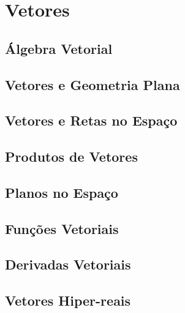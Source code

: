 \chapter{Vetores}
\label{chp:vectors}

\section{Álgebra Vetorial}
\label{sec:vectoralgebra}

\section{Vetores e Geometria Plana}
\label{sec:vectorsandplanegeometry}

\section{Vetores e Retas no Espaço}
\label{sec:vectorsinspace}

\section{Produtos de Vetores}
\label{sec:productsofvectors}

\section{Planos no Espaço}
\label{sec:planesinspace}

\section{Funções Vetoriais}
\label{sec:vectorfunc}

\section{Derivadas Vetoriais}
\label{sec:vectordiff}

\section{Vetores Hiper-reais}
\label{sec:hypervectors}

\begin{chapterproblems}
\end{chapterproblems}


